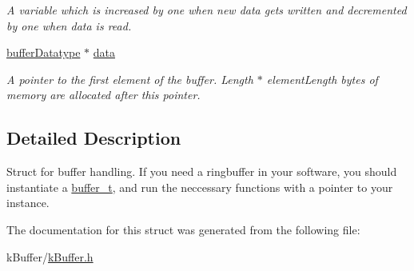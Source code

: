 \begin{DoxyCompactItemize}
\begin{DoxyCompactList}\small\item\em A variable which is increased by one when new data gets written and decremented by one when data is read. \end{DoxyCompactList}\item 
\hypertarget{structbuffer__t_a974e9a505549d9f8ad9e45cb1b562413}{}\hyperlink{k_buffer_8h_ae8d6ebfbda34ebc2e00138c04b46e9b1}{buffer\+Datatype} $\ast$ \hyperlink{structbuffer__t_a974e9a505549d9f8ad9e45cb1b562413}{data}\label{structbuffer__t_a974e9a505549d9f8ad9e45cb1b562413}

\begin{DoxyCompactList}\small\item\em A pointer to the first element of the buffer. Length $\ast$ element\+Length bytes of memory are allocated after this pointer. \end{DoxyCompactList}\end{DoxyCompactItemize}


\subsection{Detailed Description}
Struct for buffer handling. If you need a ringbuffer in your software, you should instantiate a \hyperlink{structbuffer__t}{buffer\+\_\+t}, and run the neccessary functions with a pointer to your instance. 

The documentation for this struct was generated from the following file\+:\begin{DoxyCompactItemize}
\item 
k\+Buffer/\hyperlink{k_buffer_8h}{k\+Buffer.\+h}\end{DoxyCompactItemize}
